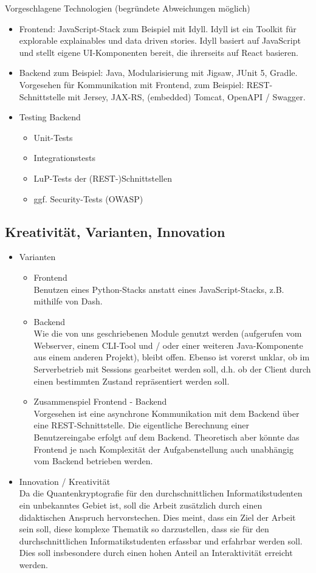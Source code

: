 Vorgeschlagene Technologien (begründete Abweichungen möglich)
\begin{itemize}
\item Frontend: JavaScript-Stack zum Beispiel mit Idyll. Idyll ist ein Toolkit für explorable explainables und data driven stories. Idyll basiert auf JavaScript und stellt eigene UI-Komponenten bereit, die ihrerseits auf React basieren.
\item Backend zum Beispiel: Java, Modularisierung mit Jigsaw, JUnit 5, Gradle. Vorgesehen für Kommunikation mit Frontend, zum Beispiel: REST-Schnittstelle mit Jersey, JAX-RS, (embedded) Tomcat, OpenAPI / Swagger. 
\item Testing Backend  \begin{itemize} \item Unit-Tests \item Integrationstests  \item LuP-Tests der (REST-)Schnittstellen \item ggf. Security-Tests (OWASP)  \end{itemize} 
\end{itemize}
\subsection{Kreativität, Varianten, Innovation}
\begin{itemize}
\item Varianten \begin{itemize}
\item Frontend \\ Benutzen eines Python-Stacks anstatt eines JavaScript-Stacks, z.B. mithilfe von Dash.
\item Backend \\ Wie die von uns geschriebenen Module genutzt werden (aufgerufen vom Webserver, einem CLI-Tool und / oder einer weiteren Java-Komponente aus einem anderen Projekt), bleibt offen. Ebenso ist vorerst unklar, ob im Serverbetrieb mit Sessions gearbeitet werden soll, d.h. ob der Client durch einen bestimmten Zustand repräsentiert werden soll. 
\item Zusammenspiel Frontend - Backend \\
Vorgesehen ist eine asynchrone Kommunikation mit dem Backend über eine REST-Schnittstelle. Die eigentliche Berechnung einer Benutzereingabe erfolgt auf dem Backend. Theoretisch aber könnte das Frontend je nach Komplexität der Aufgabenstellung auch unabhängig vom Backend betrieben werden.
\end{itemize}
\item Innovation / Kreativität \\ Da die Quantenkryptografie für den durchschnittlichen Informatikstudenten ein unbekanntes Gebiet ist, soll die Arbeit zusätzlich durch einen didaktischen Anspruch hervorstechen. Dies meint, dass ein Ziel der Arbeit sein soll, diese komplexe Thematik so darzustellen, dass sie für den durchschnittlichen Informatikstudenten erfassbar und erfahrbar werden soll. Dies soll insbesondere durch einen hohen Anteil an Interaktivität erreicht werden. 
\end{itemize}



